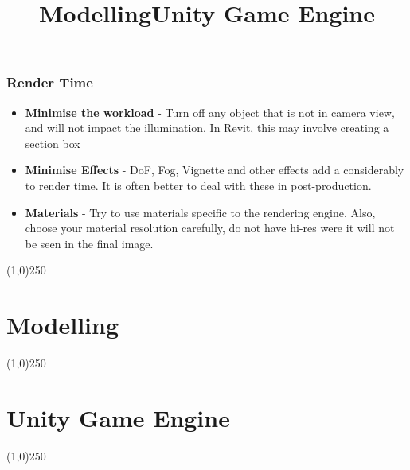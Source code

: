 \begin{frame}
\frametitle{Render Time}
\begin{itemize}
	\item \textbf{Minimise the workload} - Turn off any object that is not in camera view, and will not impact the illumination.  In Revit, this may involve creating a section box
	\item \textbf{Minimise Effects} - DoF, Fog, Vignette and other effects add a considerably to render time.  It is often better to deal with these in post-production.
	\item \textbf{Materials} - Try to use materials specific to the rendering engine.  Also, choose your material resolution carefully, do not have hi-res were it will not be seen in the final image.
\end{itemize}

\end{frame}
\begin{center}\line(1,0){250}\end{center}













\section{Modelling}
\begin{frame}
	\title[Modelling]{Modelling}
	\titlepage
\end{frame}\begin{center}\line(1,0){250}\end{center}







\section{Unity Game Engine}
\begin{frame}
\title[Modelling]{Unity Game Engine}
\titlepage
\end{frame}\begin{center}\line(1,0){250}\end{center}


